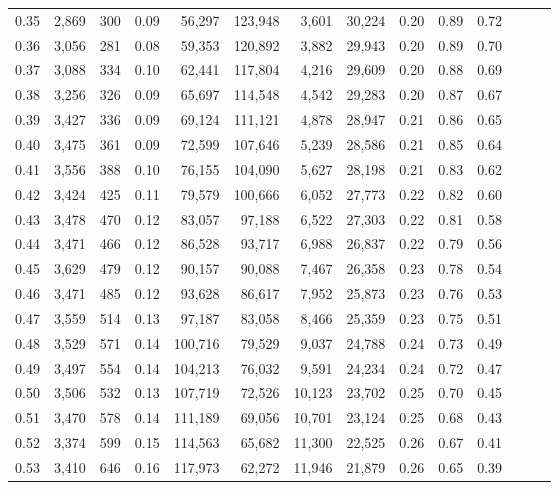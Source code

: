 \begin{tabular}{rrrrrrrrrrrrrr}
0.35 &  2,869 &  300 &  0.09 &   56,297 &  123,948 &   3,601 &  30,224 &  0.20 &  0.89 &      0.72 \\
0.36 &  3,056 &  281 &  0.08 &   59,353 &  120,892 &   3,882 &  29,943 &  0.20 &  0.89 &      0.70 \\
0.37 &  3,088 &  334 &  0.10 &   62,441 &  117,804 &   4,216 &  29,609 &  0.20 &  0.88 &      0.69 \\
0.38 &  3,256 &  326 &  0.09 &   65,697 &  114,548 &   4,542 &  29,283 &  0.20 &  0.87 &      0.67 \\
0.39 &  3,427 &  336 &  0.09 &   69,124 &  111,121 &   4,878 &  28,947 &  0.21 &  0.86 &      0.65 \\
0.40 &  3,475 &  361 &  0.09 &   72,599 &  107,646 &   5,239 &  28,586 &  0.21 &  0.85 &      0.64 \\
0.41 &  3,556 &  388 &  0.10 &   76,155 &  104,090 &   5,627 &  28,198 &  0.21 &  0.83 &      0.62 \\
0.42 &  3,424 &  425 &  0.11 &   79,579 &  100,666 &   6,052 &  27,773 &  0.22 &  0.82 &      0.60 \\
0.43 &  3,478 &  470 &  0.12 &   83,057 &   97,188 &   6,522 &  27,303 &  0.22 &  0.81 &      0.58 \\
0.44 &  3,471 &  466 &  0.12 &   86,528 &   93,717 &   6,988 &  26,837 &  0.22 &  0.79 &      0.56 \\
0.45 &  3,629 &  479 &  0.12 &   90,157 &   90,088 &   7,467 &  26,358 &  0.23 &  0.78 &      0.54 \\
0.46 &  3,471 &  485 &  0.12 &   93,628 &   86,617 &   7,952 &  25,873 &  0.23 &  0.76 &      0.53 \\
0.47 &  3,559 &  514 &  0.13 &   97,187 &   83,058 &   8,466 &  25,359 &  0.23 &  0.75 &      0.51 \\
0.48 &  3,529 &  571 &  0.14 &  100,716 &   79,529 &   9,037 &  24,788 &  0.24 &  0.73 &      0.49 \\
0.49 &  3,497 &  554 &  0.14 &  104,213 &   76,032 &   9,591 &  24,234 &  0.24 &  0.72 &      0.47 \\
0.50 &  3,506 &  532 &  0.13 &  107,719 &   72,526 &  10,123 &  23,702 &  0.25 &  0.70 &      0.45 \\
0.51 &  3,470 &  578 &  0.14 &  111,189 &   69,056 &  10,701 &  23,124 &  0.25 &  0.68 &      0.43 \\
0.52 &  3,374 &  599 &  0.15 &  114,563 &   65,682 &  11,300 &  22,525 &  0.26 &  0.67 &      0.41 \\
0.53 &  3,410 &  646 &  0.16 &  117,973 &   62,272 &  11,946 &  21,879 &  0.26 &  0.65 &      0.39 \\

\end{tabular}
